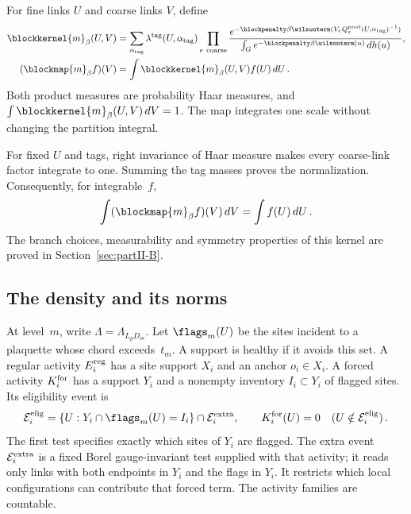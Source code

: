 \begin{definition}\label{def:D04}
For fine links $U$ and coarse links $V$, define
\begin{align*}
\blockkernel{m}_\beta(U,V)
&=\sum_{\alpha_{\rm tag}}\lambda^{\rm tag}(U,\alpha_{\rm tag})
\prod_{e\ {\rm coarse}}
\frac{e^{-\blockpenalty\beta\wilsonterm(V_eQ_e^{\rm pred}(U,\alpha_{\rm tag})^{-1})}}
{\int_G e^{-\blockpenalty\beta\wilsonterm(u)}\,dh(u)},\\
(\blockmap{m}_\beta f)(V)&=\int\blockkernel{m}_\beta(U,V)f(U)\,dU\,.
\end{align*}
Both product measures are probability Haar measures, and $\int\blockkernel{m}_\beta(U,V)\,dV=1$. The map integrates one scale without changing the partition integral.
\end{definition}

For fixed $U$ and tags, right invariance of Haar measure makes every coarse-link factor integrate to one. Summing the tag masses proves the normalization. Consequently, for integrable~$f$,
\begin{equation}\label{eq:I12-partition-preservation}
\int(\blockmap{m}_\beta f)(V)\,dV=\int f(U)\,dU\,.
\end{equation}
The branch choices, measurability and symmetry properties of this kernel are proved in Section~\ref{sec:partII-B}.

\subsection{The density and its norms}

At level~$m$, write $\Lambda=\Lambda_{L_pD_m}$. Let $\flags_m(U)$ be the sites incident to a plaquette whose chord exceeds~$t_m$. A support is healthy if it avoids this set. A regular activity $E_i^{\rm reg}$ has a site support $X_i$ and an anchor $o_i\in X_i$. A forced activity $K_i^{\rm for}$ has a support $Y_i$ and a nonempty inventory $I_i\subset Y_i$ of flagged sites. Its eligibility event is
\begin{equation}\label{eq:I12-forced-eligibility}
\mathcal E_i^{\rm elig}=\{U:Y_i\cap\flags_m(U)=I_i\}\cap\mathcal E_i^{\rm extra},\qquad
K_i^{\rm for}(U)=0\quad(U\notin\mathcal E_i^{\rm elig})\,.
\end{equation}
The first test specifies exactly which sites of $Y_i$ are flagged. The extra event $\mathcal E_i^{\rm extra}$ is a fixed Borel gauge-invariant test supplied with that activity; it reads only links with both endpoints in $Y_i$ and the flags in $Y_i$. It restricts which local configurations can contribute that forced term. The activity families are countable.

